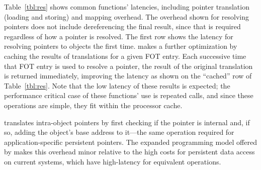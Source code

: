 {    Table~\ref{tbl:res} shows common \Twizzler functions' latencies, including pointer
    translation (loading and storing) and mapping overhead.
    The overhead shown for resolving pointers does not
    include dereferencing the final result, since that is required regardless of how a pointer is
    resolved. The first row shows the latency for resolving pointers to objects the first time.
    \Twizzler makes a further optimization by
    caching the results of translations for a given FOT entry. Each successive
    time that FOT entry is used to resolve a pointer, the result of the original translation is returned
    immediately, improving the latency as shown on the ``cached'' row of Table~\ref{tbl:res}. Note that
    the low latency of these results is expected; the performance critical case of these functions' use
    is repeated calls, and since these operations are simple, they fit within the processor cache.

    \Twizzler translates intra-object pointers by first
    checking if the pointer is internal and, if so, adding the object's base
    address to it---the same operation required for application-specific
    persistent pointers. The expanded programming model offered by \Twizzler
    makes this overhead minor relative to the high costs for persistent data access on
    current systems, which have high-latency for equivalent operations.

}
